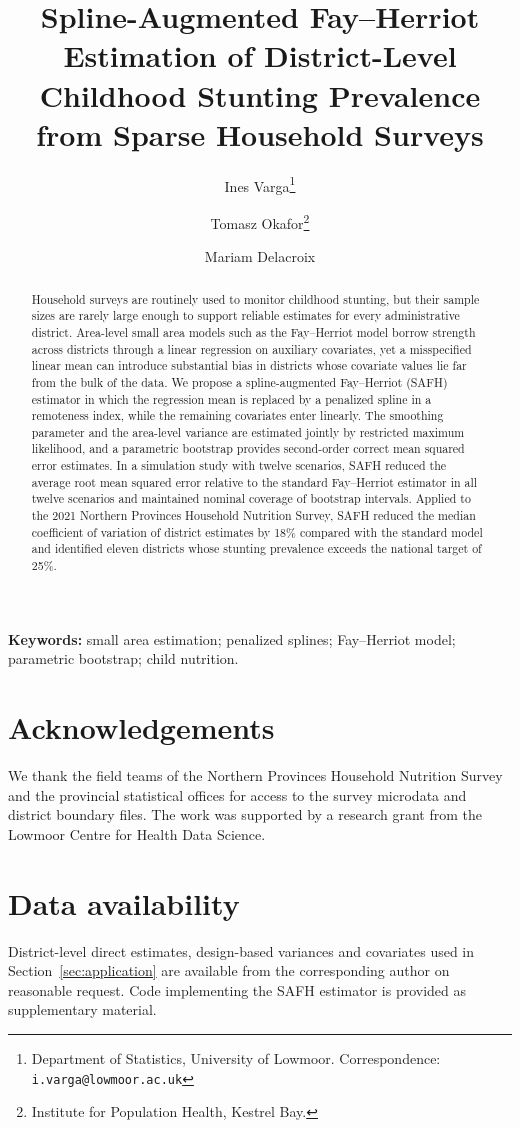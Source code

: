 \documentclass[11pt]{article}
\title{Spline-Augmented Fay--Herriot Estimation of District-Level\\
Childhood Stunting Prevalence from Sparse Household Surveys}
\author{
  Ines Varga\thanks{Department of Statistics, University of Lowmoor.
  Correspondence: \texttt{i.varga@lowmoor.ac.uk}}
  \and
  Tomasz Okafor\thanks{Institute for Population Health, Kestrel Bay.}
  \and
  Mariam Delacroix\footnotemark[1]
}
\date{}
\begin{document}
\maketitle

\begin{abstract}
Household surveys are routinely used to monitor childhood stunting, but their
sample sizes are rarely large enough to support reliable estimates for every
administrative district. Area-level small area models such as the Fay--Herriot
model borrow strength across districts through a linear regression on auxiliary
covariates, yet a misspecified linear mean can introduce substantial bias in
districts whose covariate values lie far from the bulk of the data. We propose a
spline-augmented Fay--Herriot (SAFH) estimator in which the regression mean is
replaced by a penalized spline in a remoteness index, while the remaining
covariates enter linearly. The smoothing parameter and the area-level variance
are estimated jointly by restricted maximum likelihood, and a parametric
bootstrap provides second-order correct mean squared error estimates. In a
simulation study with twelve scenarios, SAFH reduced the average root mean
squared error relative to the standard Fay--Herriot estimator in all twelve
scenarios and maintained nominal coverage of bootstrap intervals. Applied to the
2021 Northern Provinces Household Nutrition Survey, SAFH reduced the median
coefficient of variation of district estimates by 18\% compared with the
standard model and identified eleven districts whose stunting prevalence
exceeds the national target of 25\%.
\end{abstract}

\noindent\textbf{Keywords:} small area estimation; penalized splines;
Fay--Herriot model; parametric bootstrap; child nutrition.







\section*{Acknowledgements}
We thank the field teams of the Northern Provinces Household Nutrition Survey
and the provincial statistical offices for access to the survey microdata and
district boundary files. The work was supported by a research grant from the
Lowmoor Centre for Health Data Science.

\section*{Data availability}
District-level direct estimates, design-based variances and covariates used in
Section~\ref{sec:application} are available from the corresponding author on
reasonable request. Code implementing the SAFH estimator is provided as
supplementary material.




\appendix

\end{document}
